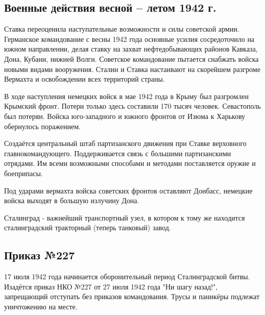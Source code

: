 \subsection{Военные действия весной -- летом 1942 г.}

Ставка переоценила наступательные возможности и силы советской армии. Германское командование с весны 1942 года основные усилия сосредоточило на южном направлении, делая ставку на захват нефтедобывающих районов Кавказа, Дона, Кубани, нижней Волги. Советское командование пытается снабжать войска новыми видами вооружения. Сталин и Ставка настаивают на скорейшем разгроме Вермахта и освобождении всех территорий страны.

В ходе наступления немецких войск в мае 1942 года в Крыму был разгромлен Крымский фронт. Потери только здесь составили 170 тысяч человек. Севастополь был потерян. Войска юго-западного и южного фронтов от Изюма к Харькову обернулось поражением.

Создаётся центральный штаб партизанского движения при Ставке верховного главнокомандующего. Поддерживается связь с большими партизанскими отрядами. Им всеми возможными способами и методами поставляется оружие и боеприпасы.

Под ударами вермахта войска советских фронтов оставляют Донбасс, немецкие войска выходят в большую излучину Дона.

Сталинград - важнейший транспортный узел, в котором к тому же находится сталинградский тракторный (теперь танковый) завод.

\subsection{Приказ №227}

17 июля 1942 года начинается оборонительный период Сталинградской битвы. Изадётся приказ НКО №227 от 27 июля 1942 года "Ни шагу назад!", запрещающий отступать без приказов командования. Трусы и паникёры подлежат уничтожению на месте.